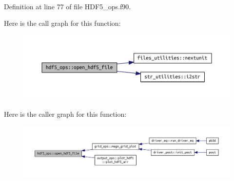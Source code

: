 Definition at line 77 of file H\+D\+F5\+\_\+ops.\+f90.

Here is the call graph for this function\+:\nopagebreak
\begin{figure}[H]
\begin{center}
\leavevmode
\includegraphics[width=350pt]{namespacehdf5__ops_a72c3974bb01858e1b232fc888d387bb6_cgraph}
\end{center}
\end{figure}
Here is the caller graph for this function\+:\nopagebreak
\begin{figure}[H]
\begin{center}
\leavevmode
\includegraphics[width=350pt]{namespacehdf5__ops_a72c3974bb01858e1b232fc888d387bb6_icgraph}
\end{center}
\end{figure}
\mbox{\label{namespacehdf5__ops_ad794d069ca355f28536fba7e0d21bc13}} 
